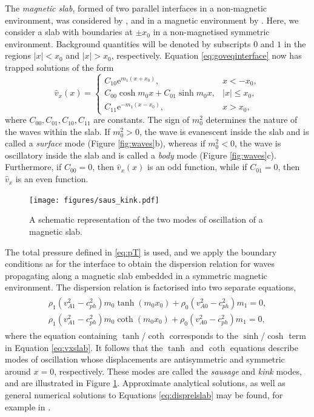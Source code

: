 The \emph{magnetic slab}, formed of two parallel interfaces in a non-magnetic environment, was considered by \cite{Roberts1981b}, and in a magnetic environment by \cite{Edwin1982}.
Here, we consider a slab with boundaries at $\pm x_0$ in a non-magnetised symmetric environment.
Background quantities will be denoted by subscripts $0$ and $1$ in the regions $|x| < x_0$ and $|x| > x_0$, respectively.
Equation \eqref{eq:goveqinterface} now has trapped solutions of the form
%
\begin{equation}
\label{eq:vxslab}
\hat{v}_x (x) = 
\begin{cases}
C_{10} \mathrm{e}^{m_1 (x + x_0)}, & x < - x_0,
\\
C_{00} \cosh m_0 x + C_{01} \sinh m_0 x, & |x| \leq x_0,
\\
C_{11} \mathrm{e}^{-m_1 (x - x_0)}, & x > x_0,
\end{cases}
\end{equation}
%
where $C_{00}, C_{01}, C_{10}, C_{11}$ are constants.
The sign of $m_0^2$ determines the nature of the waves within the slab.
If $m_0^2 > 0$, the wave is evanescent inside the slab and is called a \emph{surface} mode (Figure \ref{fig:waves}b), whereas if $m_0^2 < 0$, the wave is oscillatory inside the slab and is called a \emph{body} mode (Figure \ref{fig:waves}c).
Furthermore, if $C_{00} = 0$, then $\hat{v}_x (x)$ is an odd function, while if $C_{01} = 0$, then $\hat{v}_x$ is an even function.

\begin{figure}[t]
\centering
\texttt{[image: figures/saus\_kink.pdf]}
\caption{A schematic representation of the two modes of oscillation of a magnetic slab.
}
\label{fig:modessym}
\end{figure}

The total pressure defined in \eqref{eq:pT} is used, and we apply the boundary conditions as for the interface to obtain the dispersion relation for waves propagating along a magnetic slab embedded in a symmetric magnetic environment.
The dispersion relation is factorised into two separate equations,
%
\begin{align}
\begin{split}
\label{eq:disprelslab}
\rho_1 (v_{A 1}^2 - c_{ph}^2) m_0 \tanh (m_0 x_0)
+ \rho_0 (v_{A 0}^2 - c_{ph}^2) m_1 = 0,
\\[0.3cm]
\rho_1 (v_{A 1}^2 - c_{ph}^2) m_0 \coth (m_0 x_0)
+ \rho_0 (v_{A 0}^2 - c_{ph}^2) m_1 = 0,
\end{split}
\end{align}
%
where the equation containing $\tanh$/$\coth$ corresponds to the $\sinh$/$\cosh$ term in Equation \eqref{eq:vxslab}.
It follows that the $\tanh$ and $\coth$ equations describe modes of oscillation whose displacements are antisymmetric and symmetric around $x=0$, respectively.
These modes are called the \emph{sausage} and \emph{kink} modes, and are illustrated in Figure \ref{fig:modessym}.
Approximate analytical solutions, as well as general numerical solutions to Equations \eqref{eq:disprelslab} may be found, for example in \cite{Edwin1982}.

